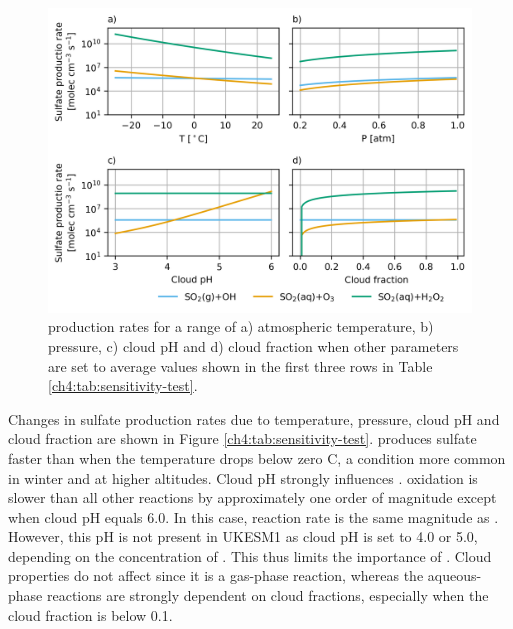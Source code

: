 \begin{figure}
    \centering
    \includegraphics{Chapter4/Figs/oxidation_sensitivity.png}
    \caption[ oxidation range]{ production rates for a range of a) atmospheric temperature, b) pressure, c) cloud pH and d) cloud fraction when other parameters are set to average values shown in the first three rows in Table \ref{ch4:tab:sensitivity-test}.}
    \label{fig:ch4:oxidation-sensitivity}
\end{figure}

Changes in sulfate production rates due to temperature, pressure, cloud pH and cloud fraction are shown in Figure \ref{ch4:tab:sensitivity-test}.  produces sulfate faster than  when the temperature drops below zero \textdegree C, a condition more common in winter and at higher altitudes. Cloud pH strongly influences .  oxidation is slower than all other reactions by approximately one order of magnitude except when cloud pH equals 6.0. In this case,  reaction rate is the same magnitude as . However, this pH is not present in UKESM1 as cloud pH is set to 4.0 or 5.0, depending on the concentration of . This thus limits the importance of . Cloud properties do not affect  since it is a gas-phase reaction, whereas the aqueous-phase reactions are strongly dependent on cloud fractions, especially when the cloud fraction is below 0.1. 


